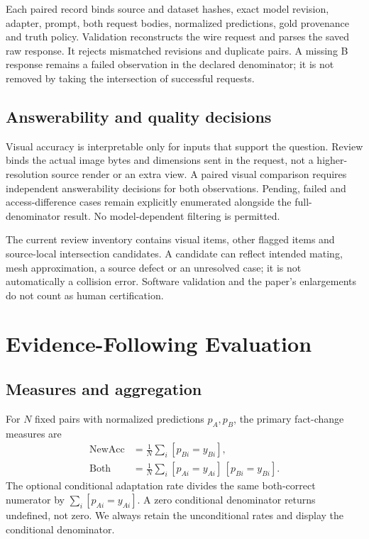 \documentclass[10pt,twocolumn,letterpaper]{article}
\begin{document}
Each paired record binds source and dataset hashes, exact model
revision, adapter, prompt, both request bodies, normalized predictions,
gold provenance and truth policy. Validation reconstructs the wire
request and parses the saved raw response. It rejects mismatched
revisions and duplicate pairs. A missing B response remains a failed
observation in the declared denominator; it is not removed by taking
the intersection of successful requests.

\subsection{Answerability and quality decisions}
Visual accuracy is interpretable only for inputs that support the
question. Review binds the actual image bytes and dimensions sent in
the request, not a higher-resolution source render or an extra view.
A paired visual comparison requires independent answerability decisions
for both observations. Pending, failed and access-difference cases
remain explicitly enumerated alongside the full-denominator result.
No model-dependent filtering is permitted.

The current review inventory contains \EvVisual{} visual items,
\EvOtherPending{} other flagged items and \EvPhysicalPending{}
source-local intersection candidates. A candidate can reflect intended
mating, mesh approximation, a source defect or an unresolved case;
it is not automatically a collision error. Software validation and the
paper's enlargements do not count as human certification.

\section{Evidence-Following Evaluation}
\subsection{Measures and aggregation}
For $N$ fixed pairs with normalized predictions $p_A,p_B$, the primary
fact-change measures are
\begin{align}
\mathrm{NewAcc}&=\frac{1}{N}\sum_i [p_{Bi}=y_{Bi}],\\
\mathrm{Both}&=\frac{1}{N}\sum_i
 [p_{Ai}=y_{Ai}]\,[p_{Bi}=y_{Bi}].
\end{align}
The optional conditional adaptation rate divides the same both-correct
numerator by $\sum_i[p_{Ai}=y_{Ai}]$. A zero conditional denominator
returns undefined, not zero. We always retain the unconditional rates
and display the conditional denominator.
\end{document}
